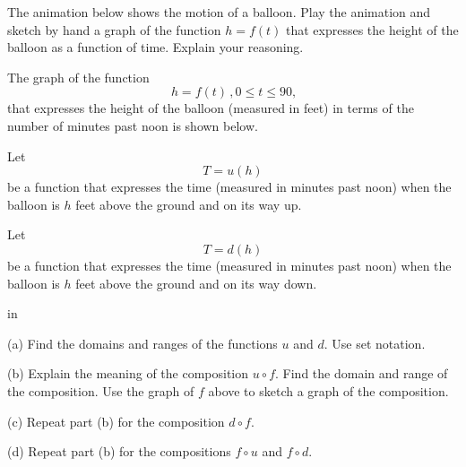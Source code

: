 \documentclass{ximera}
\newcommand{\pskip}{\vskip 0.1 in}
\begin{document}
\begin{exploration} \label{E2:Quadratics}
The animation below shows the motion of a balloon. Play the animation and sketch by hand a graph of the function $h=f(t)$ that expresses the height of the balloon as a function of time. Explain your reasoning.


 
\begin{onlineOnly}
    \begin{center}
\end{center}
\end{onlineOnly}
\end{exploration}



\begin{exploration} \label{E4:Quadratics}
The graph of the function 
\[
\   h=f(t) \, , 0\leq t \leq 90, 
\]
that expresses the height of the balloon (measured in feet) in terms of the number of minutes past noon is shown below. 

 
\begin{onlineOnly}
    \begin{center}
\end{center}
\end{onlineOnly}


Let 
\[
    T = u(h)
\]
be a function that expresses the time (measured in minutes past noon) when the balloon is $h$ feet above the ground and on its way up.

Let 
\[
    T = d(h)
\]
be a function that expresses the time (measured in minutes past noon) when the balloon is $h$ feet above the ground and on its way down.

\pskip

(a) Find the domains and ranges of the functions $u$ and $d$. Use set notation.

(b) Explain the meaning of the composition $u\circ f$. Find the domain and range of the composition. Use the graph of $f$ above to sketch a graph of the composition.

(c) Repeat part (b) for the composition $d\circ f$.

(d) Repeat part (b) for the compositions $f\circ u$ and $f\circ d$.


\end{exploration}
\end{document}
